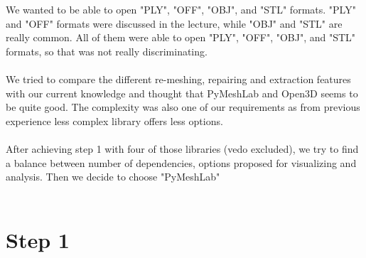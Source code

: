 \documentclass[10pt,twocolumn,letterpaper]{article}
\begin{document}
	We wanted to be able to open "PLY", "OFF", "OBJ", and "STL" formats. "PLY" and "OFF" formats were discussed in the lecture, while "OBJ" and "STL" are really common. All of them were able to open "PLY", "OFF", "OBJ", and "STL" formats, so that was not really discriminating. \\ \\
	We tried to compare the different re-meshing, repairing and extraction features with our current knowledge and thought that PyMeshLab and Open3D seems to be quite good. The complexity was also one of our requirements as from previous experience less complex library offers less options. \\ \\
	After achieving step 1 with four of those libraries (vedo excluded), we try to find a balance between number of dependencies, options proposed for visualizing and analysis. Then we decide to choose "PyMeshLab"\cite{pymeshlab} \\ \\

\section{Step 1}
\end{document}
